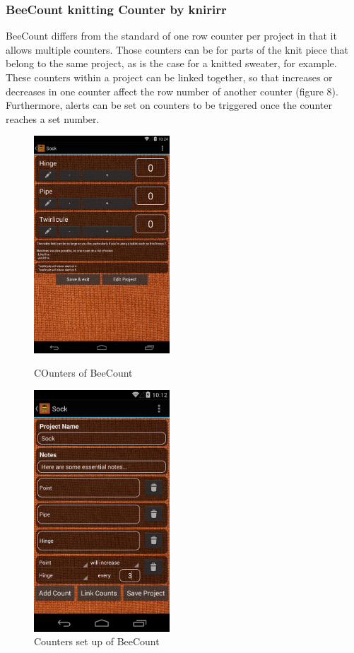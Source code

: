 \subsubsection{BeeCount knitting Counter by knirirr}
BeeCount differs from the standard of one row counter per project in that it allows multiple counters. Those counters can be for parts of the knit piece that  belong to the same project, as is the case for a knitted sweater, for example. These counters within a project can be linked together, so that increases or decreases in one counter affect the row number of another counter (figure 8). Furthermore, alerts can be set on counters to be triggered once the counter
reaches a set number.

\begin{figure}[H]
\centering
\begin{minipage}{.5\textwidth}
  \centering
  \includegraphics[width=2in]{images/image01.png}
  \caption[Counters of BeeCount ]{COunters of BeeCount}
  \label{fig_beecount1}
\end{minipage}
\begin{minipage}{.5\textwidth}
  \centering
  \includegraphics[width=2in]{images/image07.png}
  \caption[Counters set up of BeeCount ]{Counters set up of BeeCount}
  \label{fig_beecount2}
\end{minipage}
\end{figure}


